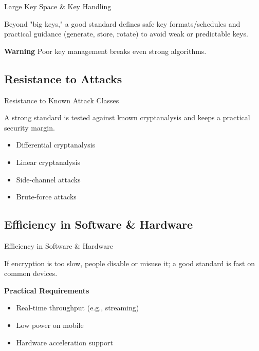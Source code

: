 \documentclass[aspectratio=169,24pt]{beamer}
\begin{document}
\begin{frame}{Large Key Space \& Key Handling}
	\begin{wide}
	Beyond "big keys," a good standard defines safe key formats/schedules and practical guidance (generate, store, rotate) to avoid weak or predictable keys.
	
	\vspace{1em}
	\begin{alertblock}{\textbf{Warning}}
		Poor key management breaks even strong algorithms.
	\end{alertblock}
	\end{wide}
\end{frame}

\subsection*{Resistance to Attacks}

\begin{frame}{Resistance to Known Attack Classes}
	\begin{wide}
	A strong standard is tested against known cryptanalysis and keeps a practical security margin.
	
	\vspace{1em}
	\begin{itemize}
		\item Differential cryptanalysis
		\item Linear cryptanalysis
		\item Side-channel attacks
		\item Brute-force attacks
	\end{itemize}
	\end{wide}
\end{frame}


\subsection*{Efficiency in Software \& Hardware}

\begin{frame}{Efficiency in Software \& Hardware}
	\begin{wide}
	If encryption is too slow, people disable or misuse it; a good standard is fast on common devices.
	
	\vspace{1em}
	\begin{block}{\textbf{Practical Requirements}}
		\begin{itemize}
			\item Real-time throughput (e.g., streaming)
			\item Low power on mobile
			\item Hardware acceleration support
		\end{itemize}
	\end{block}
	\end{wide}
\end{frame}
\end{document}

